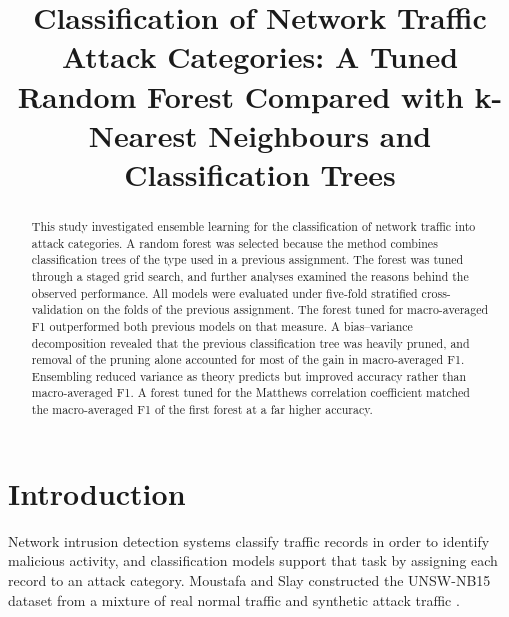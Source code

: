 \documentclass[conference]{IEEEtran}
\begin{document}
\title{Classification of Network Traffic Attack Categories: A Tuned Random Forest Compared with k-Nearest Neighbours and Classification Trees}

\author{
}

\date{}

\maketitle

\begin{abstract}
This study investigated ensemble learning for the classification of network
traffic into attack categories. A random forest was selected because the method
combines classification trees of the type used in a previous assignment. The forest was tuned
through a staged grid search, and further analyses examined the reasons behind the
observed performance. All models were evaluated under five-fold
stratified cross-validation on the folds of the previous assignment. The forest
tuned for macro-averaged F1 outperformed both previous models on that measure. A
bias--variance decomposition revealed that the previous classification tree was
heavily pruned, and removal of the pruning alone accounted for most of the gain
in macro-averaged F1. Ensembling reduced variance as theory predicts but improved
accuracy rather than macro-averaged F1. A forest tuned for the Matthews
correlation coefficient matched the macro-averaged F1 of the first forest at a
far higher accuracy.
\end{abstract}

\section{Introduction}

Network intrusion detection systems classify traffic records in order to
identify malicious activity, and classification models support that task by
assigning each record to an attack category. Moustafa and Slay constructed the
UNSW-NB15 dataset from a mixture of real normal traffic and synthetic attack
traffic \cite{moustafa2015}.
\end{document}
